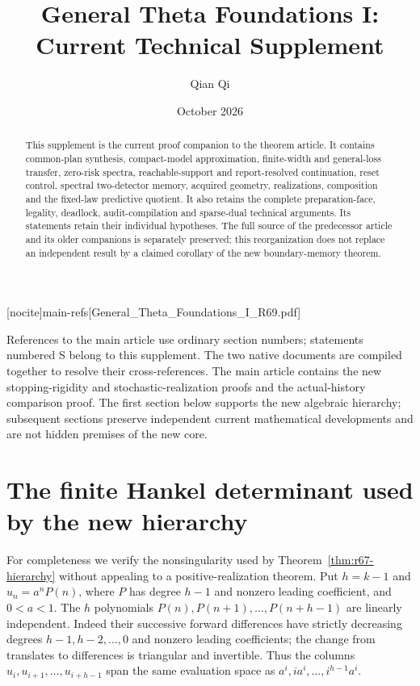 
[nocite]{main-refs}[General_Theta_Foundations_I_R69.pdf]
\renewcommand{\thesection}{S\arabic{section}}
\title[Current technical supplement]{General Theta Foundations I:\\Current Technical Supplement}
\author{Qian Qi}\date{October 2026}

\begin{abstract}
This supplement is the current proof companion to the theorem article. It contains common-plan synthesis, compact-model approximation, finite-width and general-loss transfer, zero-risk spectra, reachable-support and report-resolved continuation, reset control, spectral two-detector memory, acquired geometry, realizations, composition and the fixed-law predictive quotient. It also retains the complete preparation-face, legality, deadlock, audit-compilation and sparse-dual technical arguments. Its statements retain their individual hypotheses. The full source of the predecessor article and its older companions is separately preserved; this reorganization does not replace an independent result by a claimed corollary of the new boundary-memory theorem.
\end{abstract}
\maketitle
\enlargethispage{3pt}
\noindent References to the main article use ordinary section numbers; statements numbered S belong to this supplement. The two native documents are compiled together to resolve their cross-references. The main article contains the new stopping-rigidity and stochastic-realization proofs and the actual-history comparison proof. The first section below supports the new algebraic hierarchy; subsequent sections preserve independent current mathematical developments and are not hidden premises of the new core.
\section{The finite Hankel determinant used by the new hierarchy}\label{sec:r67-determinant}
For completeness we verify the nonsingularity used by Theorem~\ref{thm:r67-hierarchy} without appealing to a positive-realization theorem. Put $h=k-1$ and $u_n=a^nP(n)$, where $P$ has degree $h-1$ and nonzero leading coefficient, and $0<a<1$. The $h$ polynomials $P(n),P(n+1),\ldots,P(n+h-1)$ are linearly independent. Indeed their successive forward differences have strictly decreasing degrees $h-1,h-2,\ldots,0$ and nonzero leading coefficients; the change from translates to differences is triangular and invertible. Thus the columns $u_i,u_{i+1},\ldots,u_{i+h-1}$ span the same evaluation space as $a^i,i a^i,\ldots,i^{h-1}a^i$.

